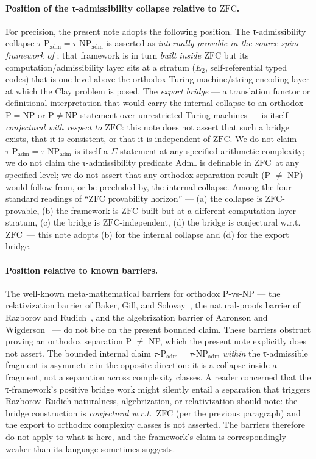 \documentclass{pantarhei-researchnote}
\newcommand{\Adm}{\ensuremath{\mathrm{Adm}_{\tau}}}
\newcommand{\Padm}{\ensuremath{\tau\text{-}\mathrm{P}_{\mathrm{adm}}}}
\newcommand{\NPadm}{\ensuremath{\tau\text{-}\mathrm{NP}_{\mathrm{adm}}}}
\newcommand{\Etwo}{\ensuremath{E_2}}
\newcommand{\ZFC}{\ensuremath{\mathrm{ZFC}}}
\newcommand{\ClassP}{\ensuremath{\mathrm{P}}}
\newcommand{\ClassNP}{\ensuremath{\mathrm{NP}}}
\begin{document}
\paragraph{Position of the τ-admissibility collapse relative to \ZFC.}
For precision, the present note adopts the following position. The
τ-admissibility collapse $\Padm = \NPadm$ is asserted as
\emph{internally provable in the source-spine framework of}
\cite{PR-III}; that framework is in turn \emph{built inside \ZFC} but
its computation/admissibility layer sits at a stratum (\Etwo,
self-referential typed codes) that is one level above the orthodox
Turing-machine/string-encoding layer at which the Clay problem is
posed. The \emph{export bridge} — a translation functor or definitional
interpretation that would carry the internal collapse to an orthodox
$\ClassP = \ClassNP$ or $\ClassP \ne \ClassNP$ statement over
unrestricted Turing machines — is itself \emph{conjectural with respect
to \ZFC}: this note does not assert that such a bridge exists, that it
is consistent, or that it is independent of \ZFC. We do not claim
$\Padm = \NPadm$ is itself a $\Sigma$-statement at any specified
arithmetic complexity; we do not claim the τ-admissibility predicate
$\Adm$ is definable in \ZFC\ at any specified level; we do not assert
that any orthodox separation result (P $\ne$ NP) would follow from, or
be precluded by, the internal collapse. Among the four standard
readings of ``ZFC provability horizon'' — (a) the collapse is
\ZFC-provable, (b) the framework is \ZFC-built but at a different
computation-layer stratum, (c) the bridge is \ZFC-independent, (d) the
bridge is conjectural w.r.t.\ \ZFC\ — this note adopts (b) for the
internal collapse and (d) for the export bridge.

\paragraph{Position relative to known barriers.}
The well-known meta-mathematical barriers for orthodox P-vs-NP — the
relativization barrier of Baker, Gill, and
Solovay~\cite{BakerGillSolovay}, the natural-proofs barrier of Razborov
and Rudich~\cite{RazborovRudichNaturalProofs}, and the algebrization
barrier of Aaronson and Wigderson~\cite{AaronsonWigdersonAlgebrization}
— do not bite on the present bounded claim. These barriers obstruct
proving an orthodox separation P $\ne$ NP, which the present note
explicitly does not assert. The bounded internal claim
$\Padm = \NPadm$ \emph{within} the τ-admissible fragment is asymmetric
in the opposite direction: it is a collapse-inside-a-fragment, not a
separation across complexity classes. A reader concerned that the
τ-framework's positive bridge work might silently entail a separation
that triggers Razborov--Rudich naturalness, algebrization, or
relativization should note: the bridge construction is \emph{conjectural
w.r.t.\ \ZFC} (per the previous paragraph) and the export to orthodox
complexity classes is not asserted. The barriers therefore do not apply
to what is here, and the framework's claim is correspondingly weaker
than its language sometimes suggests.
\end{document}
